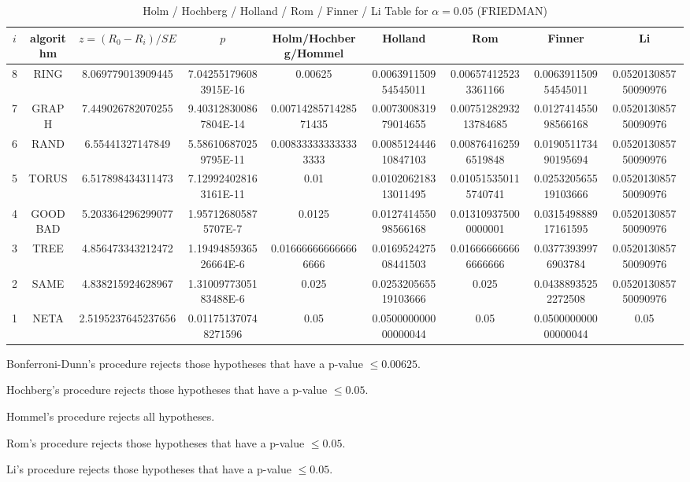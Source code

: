\documentclass[a4paper,10pt]{article}
\begin{document}
\begin{landscape}
\begin{table}[!htp]
\begin{tabular}{
|r|r|r|r|r|r|r|r|r|r|}
\end{tabular}
\end{table}

\newpage

\begin{table}[!htp]
\centering\scriptsize
\caption{Holm / Hochberg / Holland / Rom / Finner / Li Table for $\alpha=0.05$ (FRIEDMAN)}
\begin{tabular}{ccccccccc}
$i$&algorithm&$z=(R_0 - R_i)/SE$&$p$&Holm/Hochberg/Hommel&Holland&Rom&Finner&Li\\
\hline
8& RING&8.069779013909445&7.042551796083915E-16&0.00625&0.006391150954545011&0.006574125233361166&0.006391150954545011&0.052013085750090976\\
7& GRAPH&7.449026782070255&9.403128300867804E-14&0.0071428571428571435&0.007300831979014655&0.0075128293213784685&0.012741455098566168&0.052013085750090976\\
6& RAND&6.55441327147849&5.586106870259795E-11&0.008333333333333333&0.008512444610847103&0.008764162596519848&0.019051173490195694&0.052013085750090976\\
5& TORUS&6.517898434311473&7.129924028163161E-11&0.01&0.010206218313011495&0.010515350115740741&0.025320565519103666&0.052013085750090976\\
4& GOODBAD&5.203364296299077&1.957126805875707E-7&0.0125&0.012741455098566168&0.013109375000000001&0.031549888917161595&0.052013085750090976\\
3& TREE&4.856473343212472&1.1949485936526664E-6&0.016666666666666666&0.016952427508441503&0.016666666666666666&0.03773939976903784&0.052013085750090976\\
2& SAME&4.838215924628967&1.3100977305183488E-6&0.025&0.025320565519103666&0.025&0.04388935252272508&0.052013085750090976\\
1& NETA&2.5195237645237656&0.011751370748271596&0.05&0.050000000000000044&0.05&0.050000000000000044&0.05\\
\hline
\end{tabular}
\end{table}
Bonferroni-Dunn's procedure rejects those hypotheses that have a p-value $\le0.00625$.


Hochberg's procedure rejects those hypotheses that have a p-value $\le0.05$.


Hommel's procedure rejects all hypotheses.


Rom's procedure rejects those hypotheses that have a p-value $\le0.05$.


Li's procedure rejects those hypotheses that have a p-value $\le0.05$.




\end{landscape}
\end{document}
